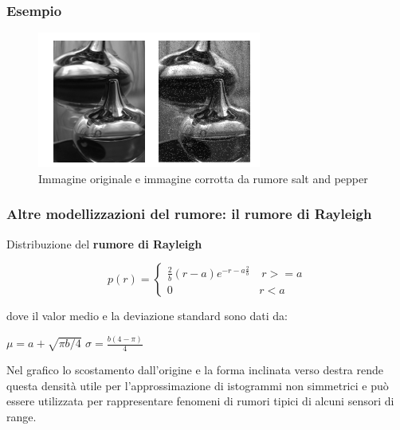
\subsubsection{Esempio}

\begin{figure}[H]
    \centering
    \includegraphics[width=\linewidth, keepaspectratio]{capitoli/immagini/imgs/esempio-salt-pepper.png}
    \caption*{Immagine originale e immagine corrotta da rumore salt and pepper}
\end{figure}

\subsubsection{Altre modellizzazioni del rumore: il rumore di Rayleigh}
Distribuzione del \textbf{rumore di Rayleigh}
\begin{center}
    $$
        p(r) = \left\{ \begin{array}{cl}
            \frac{2}{b}(r-a)e^{-{r-a}\frac{2}{b}} & \ r >= a \\
            0                                     & r<a
        \end{array} \right.
    $$
\end{center}

dove il valor medio e la deviazione standard sono dati da:

\begin{center}
    $\mu = a + \sqrt{\pi b/4}$ $\sigma = \frac{b(4-\pi)}{4}$
\end{center}

Nel grafico lo scostamento dall'origine e la forma inclinata verso
destra rende questa densità utile per l'approssimazione di
istogrammi non simmetrici e può essere utilizzata per rappresentare
fenomeni di rumori tipici di alcuni sensori di range.

